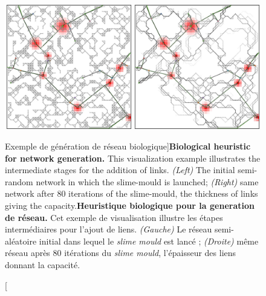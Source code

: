 


\begin{figure}
\includegraphics[width=\linewidth]{Figures/Final/7-1-1-fig-networkgrowth-bioexample.jpg}
\caption[Biological network generation example][Exemple de génération de réseau biologique]{\textbf{Biological heuristic for network generation.} This visualization example illustrates the intermediate stages for the addition of links. \textit{(Left)} The initial semi-random network in which the slime-mould is launched; \textit{(Right)} same network after 80 iterations of the slime-mould, the thickness of links giving the capacity.\label{fig:networkgrowth:bioexample}}{\textbf{Heuristique biologique pour la generation de réseau.} Cet exemple de visualisation illustre les étapes intermédiaires pour l'ajout de liens. \textit{(Gauche)} Le réseau semi-aléatoire initial dans lequel le \emph{slime mould} est lancé ; \textit{(Droite)} même réseau après 80 itérations du \emph{slime mould}, l'épaisseur des liens donnant la capacité.\label{fig:networkgrowth:bioexample}}
\end{figure}


